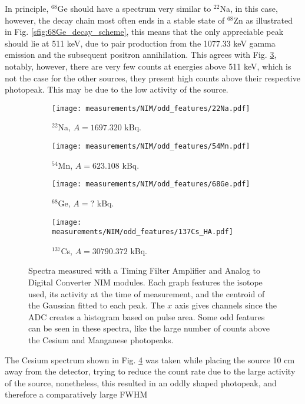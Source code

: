 In principle, $^{68}$Ge should have a spectrum very similar to $^{22}$Na, in this case, however, the decay chain most often ends in a stable state of $^{68}$Zn as illustrated in Fig. \ref{sfig:68Ge_decay_scheme}, this means that the only appreciable peak should lie at 511 \unit{\kilo\eV}, due to pair production from the 1077.33 \unit{\kilo\eV} gamma emission and the subsequent positron annihilation. This agrees with Fig. \ref{sfig:NIM_odd_68Ge}, notably, however, there are very few counts at energies above 511 \unit{\kilo\eV}, which is not the case for the other sources, they present high counts above their respective photopeak. This may be due to the low activity of the source. 

\begin{figure}[H]
  \begin{subfigure}[t]{0.47\textwidth}
    \centering
    \texttt{[image: measurements/NIM/odd\_features/22Na.pdf]}
    \caption{\label{sfig:NIM_odd_22Na}$^{22}$Na, $A=1697.320$ kBq.}
  \end{subfigure}
  \hfill
  \begin{subfigure}[t]{0.47\textwidth}
    \centering
    \texttt{[image: measurements/NIM/odd\_features/54Mn.pdf]}
    \caption{\label{sfig:NIM_odd_54Mn}$^{54}$Mn, $A=623.108$ kBq.}
  \end{subfigure}
  \medskip
  \begin{subfigure}[t]{0.47\textwidth}
    \centering
    \texttt{[image: measurements/NIM/odd\_features/68Ge.pdf]}
    \caption{\label{sfig:NIM_odd_68Ge}$^{68}$Ge, $A=$? kBq.}
  \end{subfigure}
  \hfill
  \begin{subfigure}[t]{0.47\textwidth}
    \centering
    \texttt{[image: measurements/NIM/odd\_features/137Cs\_HA.pdf]}
    \caption{\label{sfig:NIM_odd_137Cs}$^{137}$Cs, $A=30790.372$ kBq.}
  \end{subfigure}
  \caption{\label{fig:NIM_odd_features}Spectra measured with a Timing Filter Amplifier and Analog to Digital Converter NIM modules. Each graph features the isotope used, its activity at the time of measurement, and the centroid of the Gaussian fitted to each peak. The $x$ axis gives channels since the ADC creates a histogram based on pulse area. Some odd features can be seen in these spectra, like the large number of counts above the Cesium and Manganese photopeaks.}
\end{figure}

The Cesium spectrum shown in Fig. \ref{sfig:NIM_odd_137Cs} was taken while placing the source 10 cm away from the detector, trying to reduce the count rate due to the large activity of the source, nonetheless, this resulted in an oddly shaped photopeak, and therefore a comparatively large FWHM

